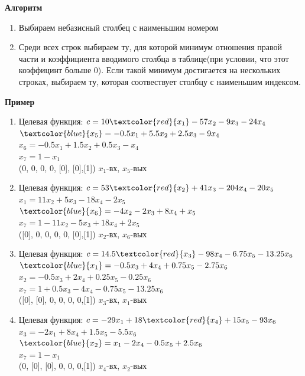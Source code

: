 \documentclass{article}
\begin{document}
    \textbf{Алгоритм}
    \begin{enumerate}
        \item Выбираем небазисный столбец с наименьшим номером
        \item Среди всех строк выбираем ту, для которой минимум отношения правой части и коэффициента вводимого столбца в таблице(при условии, что этот коэффицинт больше 0). Если такой минимум достигается на нескольких строках, выбираем ту, которая соотвествует столбцу с наименьшим индексом.
    \end{enumerate}

    \textbf{Пример}\\
    \begin{enumerate}
        \item Целевая функция: $c = 10\textcolor{red}{x_1} - 57x_2 - 9x_3 - 24x_4$\\
    $\textcolor{blue}{x_5} = -0.5x_1 + 5.5x_2 + 2.5x_3 - 9x_4$\\
    $x_6= -0.5x_1 + 1.5x_2 + 0.5x_3 - x_4$\\
    $x_7 = 1 - x_1$\\
    (0, 0, 0, 0, [0], [0],[1]) $x_1$-вх, $x_5$-вых

    \item Целевая функция: $c = 53\textcolor{red}{x_2} + 41x_3 - 204x_4 - 20x_5$\\
    $x_1 = 11x_2 + 5x_3 - 18x_4 - 2x_5$\\
    $\textcolor{blue}{x_6} = -4x_2 - 2x_3 + 8x_4 + x_5$\\
    $x_7 = 1 - 11x_2 - 5x_3 + 18x_4 + 2x_5$\\
    ([0], 0, 0, 0, 0, [0],[1]) $x_2$-вх, $x_6$-вых

    \item Целевая функция: $c = 14.5\textcolor{red}{x_3} - 98x_4 - 6.75x_5 - 13.25x_6$\\
    $\textcolor{blue}{x_1} = -0.5x_3 + 4x_4 + 0.75x_5 - 2.75x_6$\\
    $x_2 = -0.5x_3 + 2x_4 + 0.25x_5 - 0.25x_6$\\
    $x_7 = 1 + 0.5x_3 - 4x_4 - 0.75x_5 - 13.25x_6$\\
    ([0], [0], 0, 0, 0, 0,[1]) $x_3$-вх, $x_1$-вых

    \item Целевая функция: $c = -29x_1 + 18\textcolor{red}{x_4} + 15x_5 - 93x_6$\\
    $x_3 = -2x_1 + 8x_4 + 1.5x_5 - 5.5x_6$\\
    $\textcolor{blue}{x_2} = x_1 - 2x_4 - 0.5x_5 + 2.5x_6$\\
    $x_7 = 1 - x_1$\\
    (0, [0], [0], 0, 0, 0,[1]) $x_4$-вх, $x_2$-вых


\end{enumerate}
\end{document}
